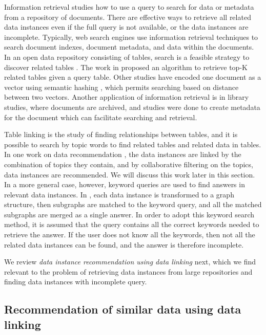 Information retrieval studies how to use a query to search for data or metadata from a repository of documents. There are effective ways to retrieve all related data instances even if the full query is not available, or the data instances are incomplete. Typically, web search engines use information retrieval techniques to search document indexes, document metadata, and data within the documents. In an open data repository consisting of tables, search is a feasible strategy to discover related tables \cite{Miller2018MakingOD,10.14778/3229863.3240491}. The work in \cite{Nargesian2018Table} proposed an algorithm to retrieve top-K related tables given a query table. Other studies have encoded one document as a vector using semantic hashing \cite{Salakhutdinov2009Semantic}, which permits searching based on distance between two vectors. Another application of information retrieval is in library studies, where documents are archived, and studies were done to create metadata for the document \cite{Park2015Evaluation} which can facilitate searching and retrieval.

Table linking is the study of finding relationships between tables, and it is possible to search by topic words to find related tables and related data in tables. In one work on data recommendation \cite{conf/esws/EllefiBDT16}, the data instances are linked by the combination of topics they contain, and by collaborative filtering on the topics, data instances are recommended. We will discuss this work later in this section. In a more general case, however, keyword queries are used to find answers in relevant data instances. In \cite{DBLP:journals/pvldb/ChanialDGLNM18}, each data instance is transformed to a graph structure, then subgraphs are matched to the keyword query, and all the matched subgraphs are merged as a single answer. In order to adopt this keyword search method, it is assumed that the query contains all the correct keywords needed to retrieve the answer. If the user does not know all the keywords, then not all the related data instances can be found, and the answer is therefore incomplete.

We review \textit{data instance recommendation using data linking} next, which we find relevant to the problem of retrieving data instances from large repositories and finding data instances with incomplete query.

\subsection{Recommendation of similar data using data linking}
\label{ssec:RecommendationOfSimilarDataUsingDataLinking}

